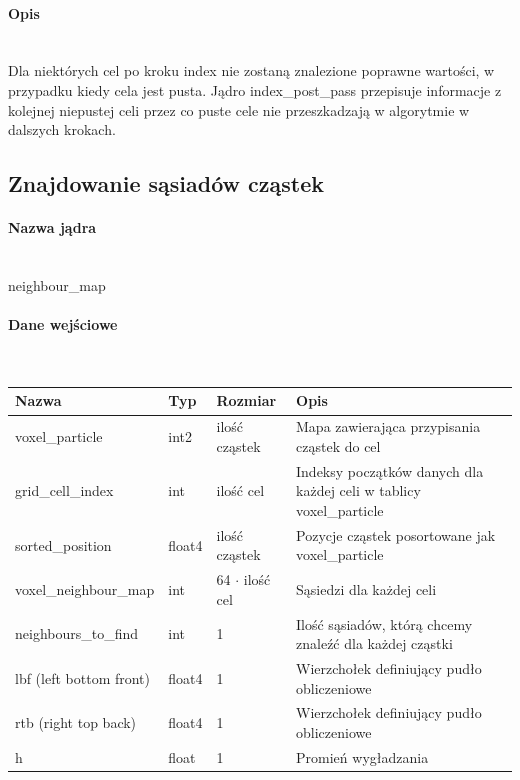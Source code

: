 \documentclass[polish, 12pt]{aghthesis}
\begin{document}
				\paragraph{Opis} \ \\
					\indent Dla niektórych cel po kroku index nie zostaną znalezione poprawne wartości, w przypadku kiedy cela jest pusta. Jądro index\_post\_pass przepisuje informacje z kolejnej niepustej celi przez co puste cele nie przeszkadzają w algorytmie w dalszych krokach.
					
		\subsection{Znajdowanie sąsiadów cząstek}
			\paragraph{Nazwa jądra} \ \\
					neighbour\_map
				\paragraph{Dane wejściowe} \ \\
					\begin{tabular}{| p{} | p{} | p{} | p{} |}
					\hline
						Nazwa & Typ & Rozmiar & Opis \\
					\hline
						voxel\_particle & int2 & ilość cząstek & Mapa zawierająca przypisania cząstek do cel \\ 
					\hline
						grid\_cell\_index & int & ilość cel & Indeksy początków danych dla każdej celi w tablicy voxel\_particle \\
					\hline
						sorted\_position & float4 & ilość cząstek & Pozycje cząstek posortowane jak voxel\_particle\\
					\hline
						voxel\_neighbour\_map & int & 64 ${\cdot}$ ilość cel & Sąsiedzi dla każdej celi \\ 
					\hline
						neighbours\_to\_find & int & 1 & Ilość sąsiadów, którą chcemy znaleźć dla każdej cząstki \\ 
					\hline
						lbf (left bottom front)& float4 & 1 & Wierzchołek definiujący pudło obliczeniowe \\ 
					\hline
						rtb (right top back) & float4 & 1 & Wierzchołek definiujący pudło obliczeniowe  \\ 
					\hline
						h & float & 1 & Promień wygładzania \\ 
					\hline	
				\end{tabular}
\end{document}
